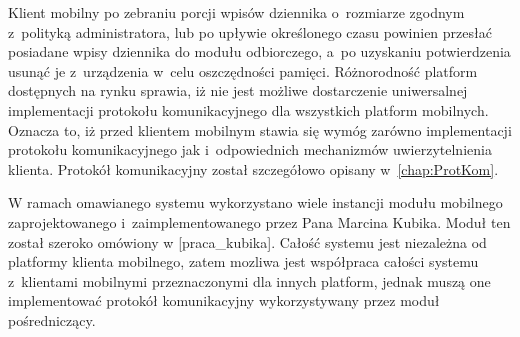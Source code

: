 Klient mobilny po zebraniu porcji wpisów dziennika o~rozmiarze zgodnym
z~polityką administratora, lub po upływie określonego czasu powinien
przesłać posiadane wpisy dziennika do modułu odbiorczego, a~po
uzyskaniu potwierdzenia usunąć je z~urządzenia w~celu oszczędności
pamięci. Różnorodność platform dostępnych na rynku sprawia, iż nie
jest możliwe dostarczenie uniwersalnej implementacji protokołu
komunikacyjnego dla wszystkich platform mobilnych. Oznacza to, iż
przed klientem mobilnym stawia się wymóg zarówno implementacji
protokołu komunikacyjnego jak i~odpowiednich mechanizmów
uwierzytelnienia klienta. Protokół komunikacyjny został szczegółowo
opisany w~\ref{chap:ProtKom}.

W ramach omawianego systemu wykorzystano wiele instancji modułu
mobilnego zaprojektowanego i~zaimplementowanego przez Pana Marcina
Kubika. Moduł ten został szeroko omówiony w [praca\_kubika]. Całość
systemu jest niezależna od platformy klienta mobilnego, zatem mozliwa
jest współpraca całości systemu z~klientami mobilnymi przeznaczonymi
dla innych platform, jednak muszą one implementować protokół
komunikacyjny wykorzystywany przez moduł pośredniczący.
